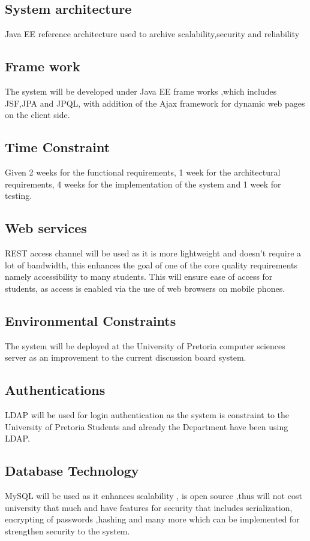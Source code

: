 \begin{flushleft}
			
\subsection*{System architecture} 
Java EE reference architecture used to archive scalability,security and reliability 

\subsection*{Frame work}
The system will be developed under Java EE frame works ,which includes JSF,JPA and JPQL, with addition of the Ajax framework for dynamic web pages on the client side.

\subsection*{Time Constraint} 
Given 2 weeks for the functional requirements, 1 week for the architectural requirements, 4 weeks for the implementation of the system and 1 week for testing.

\subsection*{Web services}
REST access channel will be used as it is more lightweight and doesn't require a lot of bandwidth, this enhances the goal of one of the core quality requirements namely accessibility to many students. This will ensure ease of access for students, as access is enabled via the use of web browsers on mobile phones.

\subsection*{Environmental Constraints}
The system will be deployed at the University of Pretoria computer sciences server as an improvement to the current discussion board system.

\subsection*{Authentications}
LDAP will be used for login authentication as the system is constraint to the University of Pretoria Students and already the Department have been using LDAP.

\subsection*{Database Technology}
MySQL will be used as it enhances scalability , is open source ,thus will not cost university that much and have features for security that includes serialization, encrypting of passwords ,hashing and many more which can be implemented for strengthen security to the system.
		
\end{flushleft}
